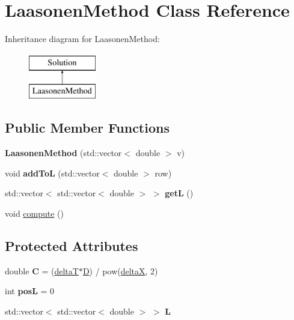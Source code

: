 \hypertarget{class_laasonen_method}{}\section{Laasonen\+Method Class Reference}
\label{class_laasonen_method}
Inheritance diagram for Laasonen\+Method\+:\begin{figure}[H]
\begin{center}
\leavevmode
\includegraphics[height=2.000000cm]{class_laasonen_method}
\end{center}
\end{figure}
\subsection*{Public Member Functions}
\begin{DoxyCompactItemize}
\item 
\mbox{\label{class_laasonen_method_a82f953953a8425ad936f75ddc9954a34}} 
{\bfseries Laasonen\+Method} (std\+::vector$<$ double $>$ v)
\item 
\mbox{\label{class_laasonen_method_a8eb364e47a161f8ca4700c8899786910}} 
void {\bfseries add\+ToL} (std\+::vector$<$ double $>$ row)
\item 
\mbox{\label{class_laasonen_method_a00aa549123730dc16651d06db8377523}} 
std\+::vector$<$ std\+::vector$<$ double $>$ $>$ {\bfseries getL} ()
\item 
void \hyperlink{class_laasonen_method_ac5507d58a6c59f0ba9eaa3ca54a51f5d}{compute} ()
\end{DoxyCompactItemize}
\subsection*{Protected Attributes}
\begin{DoxyCompactItemize}
\item 
\mbox{\label{class_laasonen_method_a9261b579f612bf4ce6b0d85cbe39bb56}} 
double {\bfseries C} = (\hyperlink{class_solution_a116a08a1a8793618fb5269016cfd9b61}{deltaT}$\ast$\hyperlink{class_solution_af647b9b893549259060034672babb0f8}{D}) / pow(\hyperlink{class_solution_a8e97e5534ddcde31983432b8fb2050ff}{deltaX}, 2)
\item 
\mbox{\label{class_laasonen_method_a9bfc5f53066a6dec716d07d046274669}} 
int {\bfseries posL} = 0
\item 
\mbox{\label{class_laasonen_method_addfca3dd9aebb1fc71ad049f11a12480}} 
std\+::vector$<$ std\+::vector$<$ double $>$ $>$ {\bfseries L}
\end{DoxyCompactItemize}


